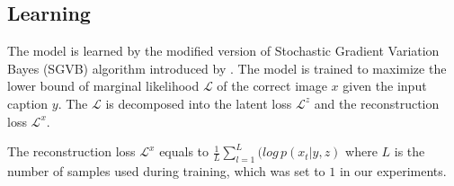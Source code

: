 \documentclass{article} %
\newcommand{\loss}{\mathcal{L}}
\newcommand{\lloss}{\mathcal{L}^{z}}
\newcommand{\rloss}{\mathcal{L}^{x}}
\begin{document}
\subsection{Learning}




The model is learned by the modified version of Stochastic Gradient Variation Bayes (SGVB) algorithm introduced by \cite{kingma_vae}. The model is trained to maximize the lower bound of marginal likelihood $\loss$ of the correct image $x$ given the input caption $y$. The $\loss$ is decomposed into the latent loss $\lloss$ and the reconstruction loss $\rloss$. 

The reconstruction loss $\rloss$ equals to $\frac{1}{L}\sum_{l=1}^{L}(log\,p(x_{t}|y,z)$ where $L$ is the number of samples used during training, which was set to $1$ in our experiments.
\end{document}
